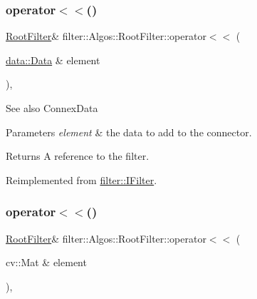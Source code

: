 \subsubsection{\texorpdfstring{operator$<$$<$()}{operator<<()}\hspace{0.1cm}{\footnotesize\ttfamily [1/2]}}
{\footnotesize\ttfamily \hyperlink{classfilter_1_1_algos_1_1_root_filter}{Root\+Filter}\& filter\+::\+Algos\+::\+Root\+Filter\+::operator$<$$<$ (\begin{DoxyParamCaption}\item[{\hyperlink{classfilter_1_1data_1_1_data}{data\+::\+Data} \&}]{element }\end{DoxyParamCaption})\hspace{0.3cm}{\ttfamily [inline]}, {\ttfamily [virtual]}}

\begin{DoxySeeAlso}{See also}
Connex\+Data 
\end{DoxySeeAlso}

\begin{DoxyParams}{Parameters}
{\em element} & the data to add to the connector. \\
\hline
\end{DoxyParams}
\begin{DoxyReturn}{Returns}
A reference to the filter. 
\end{DoxyReturn}


Reimplemented from \hyperlink{classfilter_1_1_i_filter}{filter\+::\+I\+Filter}.

\mbox{\label{classfilter_1_1_algos_1_1_root_filter_aaa4f38e30a03760153e0fc3f7d7f409e}} 
\subsubsection{\texorpdfstring{operator$<$$<$()}{operator<<()}\hspace{0.1cm}{\footnotesize\ttfamily [2/2]}}
{\footnotesize\ttfamily \hyperlink{classfilter_1_1_algos_1_1_root_filter}{Root\+Filter}\& filter\+::\+Algos\+::\+Root\+Filter\+::operator$<$$<$ (\begin{DoxyParamCaption}\item[{cv\+::\+Mat \&}]{element }\end{DoxyParamCaption})\hspace{0.3cm}{\ttfamily [inline]}, {\ttfamily [virtual]}}

